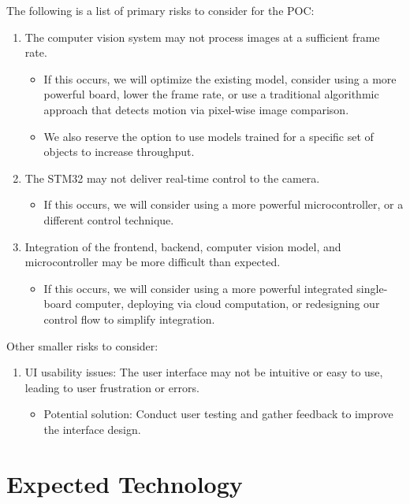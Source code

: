 \documentclass{article}
\begin{document}
The following is a list of primary risks to consider for the POC:
\begin{enumerate}
  \item The computer vision system may not process images at a sufficient frame rate.
        \begin{itemize}
          \item If this occurs, we will optimize the existing model, consider using a more
                powerful board, lower the frame rate, or use a traditional algorithmic approach
                that detects motion via pixel-wise image comparison.
          \item We also reserve the option to use models trained for a specific set of objects
                to increase throughput.
        \end{itemize}
  \item The STM32 may not deliver real-time control to the camera.
        \begin{itemize}
          \item If this occurs, we will consider using a more powerful microcontroller, or a
                different control technique.
        \end{itemize}
  \item Integration of the frontend, backend, computer vision model, and
        microcontroller may be more difficult than expected.
        \begin{itemize}
          \item If this occurs, we will consider using a more powerful integrated single-board
                computer, deploying via cloud computation, or redesigning our control flow to
                simplify integration.
        \end{itemize}
\end{enumerate}

Other smaller risks to consider:
\begin{enumerate}
  \item UI usability issues: The user interface may not be intuitive or easy to use,
        leading to user frustration or errors.
        \begin{itemize}
          \item {Potential solution}: Conduct user testing and gather feedback to improve the interface design.
        \end{itemize}
\end{enumerate}

\section{Expected Technology}
\end{document}
